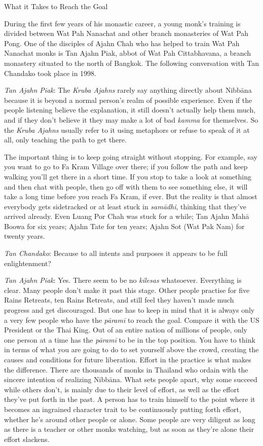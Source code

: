 What it Takes to Reach the Goal

During the first few years of his monastic career, a young monk's
training is divided between Wat Pah Nanachat and other branch
monasteries of Wat Pah Pong. One of the disciples of Ajahn Chah who has
helped to train Wat Pah Nanachat monks is Tan Ajahn Piak, abbot of Wat
Pah Cittabhavana, a branch monastery situated to the north of Bangkok.
The following conversation with Tan Chandako took place in 1998.

\emph{Tan Ajahn Piak}: The \emph{Kruba Ajahns‎‎} rarely say anything
directly about Nibbāna because it is beyond a normal person's realm of
possible experience. Even if the people listening believe the
explanation, it still doesn't actually help them much, and if they don't
believe it they may make a lot of bad \emph{kamma} for themselves. So
the \emph{Kruba Ajahns‎‎} usually refer to it using metaphors or refuse
to speak of it at all, only teaching the path to get there.

The important thing is to keep going straight without stopping. For
example, say you want to go to Fa Kram Village over there; if you follow
the path and keep walking you'll get there in a short time. If you stop
to take a look at something and then chat with people, then go off with
them to see something else, it will take a long time before you reach Fa
Kram, if ever. But the reality is that almost everybody gets sidetracked
or at least stuck in \emph{samādhi}, thinking that they've arrived
already. Even Luang Por Chah was stuck for a while; Tan Ajahn Mahā Boowa
for six years; Ajahn Tate for ten years; Ajahn Sot (Wat Pak Nam) for
twenty years.

\emph{Tan Chandako}: Because to all intents and purposes it appears to
be full enlightenment?

\emph{Tan Ajahn Piak}: Yes. There seem to be no \emph{kilesas}
whatsoever. Everything is clear. Many people don't make it past this
stage. Other people practise for five Rains Retreats, ten Rains
Retreats, and still feel they haven't made much progress and get
discouraged. But one has to keep in mind that it is always only a very
few people who have the \emph{pāramī} to reach the goal. Compare it with
the US President or the Thai King. Out of an entire nation of millions
of people, only one person at a time has the \emph{pāramī} to be in the
top position. You have to think in terms of what you are going to do to
set yourself above the crowd, creating the causes and conditions for
future liberation. Effort in the practice is what makes the difference.
There are thousands of monks in Thailand who ordain with the sincere
intention of realizing Nibbāna. What sets people apart, why some succeed
while others don't, is mainly due to their level of effort, as well as
the effort they've put forth in the past. A person has to train himself
to the point where it becomes an ingrained character trait to be
continuously putting forth effort, whether he's around other people or
alone. Some people are very diligent as long as there is a teacher or
other monks watching, but as soon as they're alone their effort
slackens.


